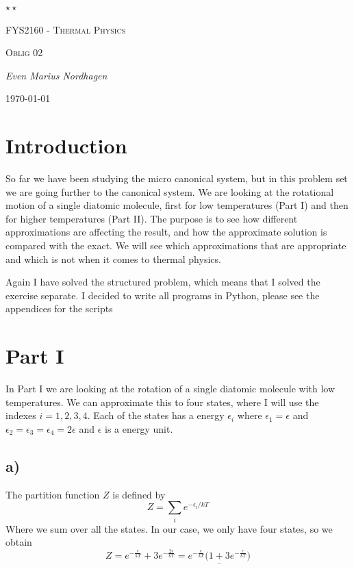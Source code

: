 \documentclass{scrartcl}
\begin{document}
\begin{titlepage}
	\centering
	{\scshape\LARGE $\star\star$  \par}
	\vspace{4cm}
	{\scshape\huge FYS2160 - Thermal Physics  \par}
	\vspace{1cm}
	{\scshape\Large Oblig 02\par}
	\vspace{2cm}
	{\Large\itshape Even Marius Nordhagen\par}
	\vfill
	{\large \today\par}
\end{titlepage}

\section*{Introduction}
So far we have been studying the micro canonical system, but in this problem set we are going further to the canonical system. We are looking at the rotational motion of a single diatomic molecule, first for low temperatures (Part I) and then for higher temperatures (Part II). The purpose is to see how different approximations are affecting the result, and how the approximate solution is compared with the exact. We will see which approximations that are appropriate and which is not when it comes to thermal physics. \par\vspace{3mm}
Again I have solved the structured problem, which means that I solved the exercise separate. I decided to write all programs in Python, please see the appendices for the scripts
\newpage

\section*{Part I}
In Part I we are looking at the rotation of a single diatomic molecule with low temperatures. We can approximate this to four states, where I will use the indexes $i=1,2,3,4$. Each of the states has a energy $\epsilon_i$ where $\epsilon_1=\epsilon$ and $\epsilon_2=\epsilon_3=\epsilon_4=2\epsilon$ and $\epsilon$ is a energy unit.

\subsection*{a)}
The partition function $Z$ is defined by 
\begin{equation}
Z=\sum_i e^{-\epsilon_i/kT}
\end{equation}
Where we sum over all the states. In our case, we only have four states, so we obtain
$$Z=e^{-\frac{\epsilon}{kT}}+3e^{-\frac{2\epsilon}{kT}}=\underline{e^{-\frac{\epsilon}{kT}}\bigg(1+3e^{-\frac{\epsilon}{kT}}\bigg)}$$
\end{document}
